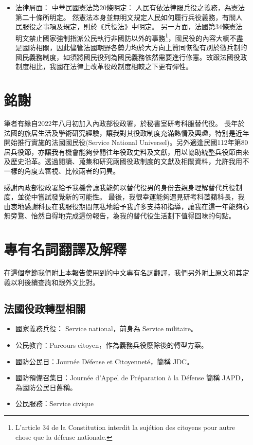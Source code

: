 \documentclass[a4paper,14pt]{extarticle}
\theoremstyle{plain}
\theoremstyle{remark}
\numberwithin{equation}{section}
\begin{document}
\begin{itemize}
  \item 法律層面： 
    中華民國憲法第20條明定： 人民有依法律服兵役之義務，為憲法第二十條所明定。 
    然憲法本身並無明文規定人民如何履行兵役義務，有關人民服役之事項及規定，則於《兵役法》中明定。
    另一方面，法國第34條憲法明文禁止國家強制指派公民執行非國防以外的事務\footnote{ L'article 34 de la Constitution interdit la sujétion des citoyens pour autre chose que la défense nationale.}，國民役的內容大綱不盡是國防相關，因此儘管法國朝野各勢力均於大方向上贊同恢復有別於徵兵制的國民義務制度，如須將國民役列為國民義務依然需要進行修憲。故跟法國役政制度相比，我國在法律上改革役政制度相較之下更有彈性。

\end{itemize}



\section{銘謝}

筆者有緣自2022年八月初加入內政部役政署，於秘書室研考科服替代役。
長年於法國的旅居生活及學術研究經驗，讓我對其役政制度充滿熱情及興趣，特別是近年開始推行實施的法國國民役(Service National Universel)。另外適逢民國112年第80屆兵役節，亦讓我有機會能夠參閱往年役政史料及文獻，用以協助統整兵役節由來及歷史沿革。透過閱讀、蒐集和研究兩國役政制度的文獻及相關資料，允許我用不一樣的角度去審視、比較兩者的同異。

感謝內政部役政署給予我機會讓我能夠以替代役男的身份去親身理解替代兵役制度，並從中嘗試發覺新的可能性。
最後，我很幸運能夠遇見研考科茝蘋科長，我由衷地感謝科長在我服役期間無私地給予我許多支持和指導，讓我在這一年能夠心無旁鶩、怡然自得地完成這份報告，為我的替代役生活劃下值得回味的句點。


\newpage 

\section{專有名詞翻譯及解釋}

在這個章節我們附上本報告使用到的中文專有名詞翻譯，我們另外附上原文和其定義以利後續查詢和跟外文比對。

\subsection{法國役政轉型相關}
\begin{itemize}
	\item 國家義務兵役： Service national，前身為 Service militaire。
	\item 公民教育：Parcours citoyen，作為義務兵役廢除後的轉型方案。
	\item 國防公民日：Journée Défense et Citoyenneté，簡稱 JDC。
	\item 國防預備召集日：Journée d'Appel de Préparation à la Défense 簡稱 JAPD，為國防公民日舊稱。
	\item 公民服務：Service civique
\end{itemize}
\end{document}
